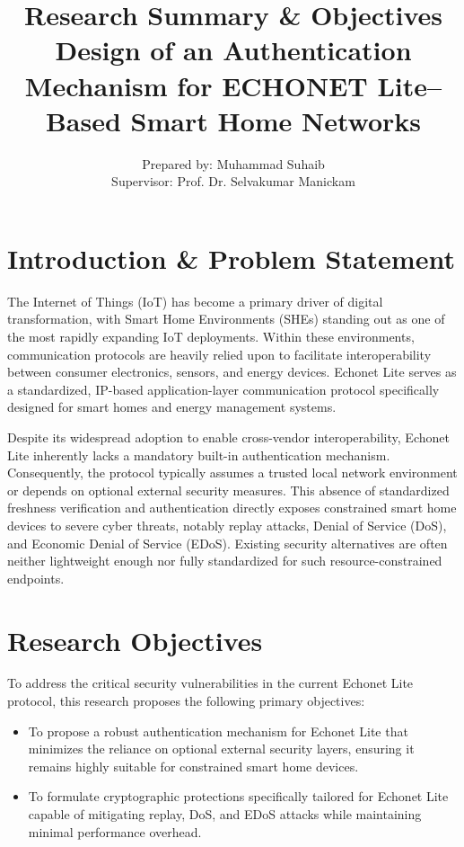 \documentclass[11pt,a4paper]{article}
\title{\textbf{Research Summary \& Objectives} \\ \large Design of an Authentication Mechanism for ECHONET Lite–Based Smart Home Networks}
\author{Prepared by: Muhammad Suhaib \\ Supervisor: Prof. Dr. Selvakumar Manickam}
\date{} %
\begin{document}
\maketitle

\section{Introduction \& Problem Statement}
The Internet of Things (IoT) has become a primary driver of digital transformation, with Smart Home Environments (SHEs) standing out as one of the most rapidly expanding IoT deployments. Within these environments, communication protocols are heavily relied upon to facilitate interoperability between consumer electronics, sensors, and energy devices. Echonet Lite serves as a standardized, IP-based application-layer communication protocol specifically designed for smart homes and energy management systems.

Despite its widespread adoption to enable cross-vendor interoperability, Echonet Lite inherently lacks a mandatory built-in authentication mechanism. Consequently, the protocol typically assumes a trusted local network environment or depends on optional external security measures. This absence of standardized freshness verification and authentication directly exposes constrained smart home devices to severe cyber threats, notably replay attacks, Denial of Service (DoS), and Economic Denial of Service (EDoS). Existing security alternatives are often neither lightweight enough nor fully standardized for such resource-constrained endpoints.

\section{Research Objectives}
To address the critical security vulnerabilities in the current Echonet Lite protocol, this research proposes the following primary objectives:
\begin{itemize}
    \item To propose a robust authentication mechanism for Echonet Lite that minimizes the reliance on optional external security layers, ensuring it remains highly suitable for constrained smart home devices.
    \item  To formulate cryptographic protections specifically tailored for Echonet Lite capable of mitigating replay, DoS, and EDoS attacks while maintaining minimal performance overhead.
\end{itemize}
\end{document}
